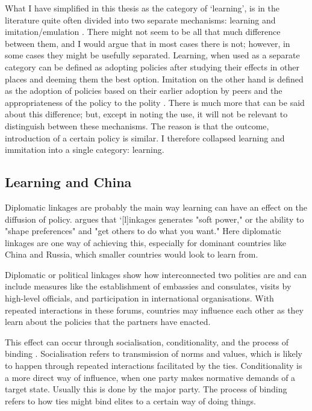 What I have simplified in this thesis as the category of `learning', is in the literature quite often divided into two separate mechanisms: learning and imitation/emulation \citep{ elkins_waves_2005, gilardi_four_2016, shipan_mechanisms_2008}. There might not seem to be all that much difference between them, and I would argue that in most cases there is not; however, in some cases they might be usefully separated. Learning, when used as a separate category can be defined as adopting policies after studying their effects in other places and deeming them the best option. Imitation on the other hand is defined as the adoption of policies based on their earlier adoption by peers and the appropriateness of the policy to the polity \citep[pp. 799-801]{simmons_introduction_2006}. There is much more that can be said about this difference; but, except in noting the use, it will not be relevant to distinguish between these mechanisms. The reason is that the outcome, introduction of a certain policy is similar. I therefore collapsed learning and immitation into a single category: learning. 

\subsection{Learning and China}

Diplomatic linkages are probably the main way learning can have an effect on the diffusion of policy. \citet[p. 385]{levitsky_linkage_2006} argues that `[l]inkages generates "soft power," or the ability to "shape preferences" and "get others to do what you want." Here diplomatic linkages are one way of achieving this, especially for dominant countries like China and Russia, which smaller countries would look to learn from.

Diplomatic or political linkages show how interconnected two polities are and can include measures like the establishment of embassies and consulates, visits by high-level officials, and participation in international organisations. With repeated interactions in these forums, countries may influence each other as they learn about the policies that the partners have enacted. 

This effect can occur through socialisation, conditionality, and the process of binding \citep[pp. 1323-1326]{ambrosio_catching_2008}. Socialisation refers to transmission of norms and values, which is likely to happen through repeated interactions facilitated by the ties. Conditionality is a more direct way of influence, when one party makes normative demands of a target state. Usually this is done by the major party. The process of binding refers to how ties might bind elites to a certain way of doing things.

